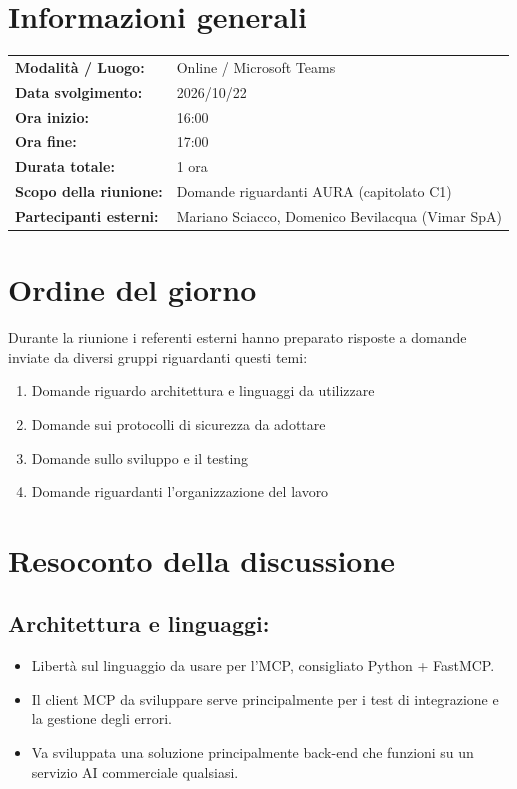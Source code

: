 \documentclass[a4paper, 11pt]{article}
\begin{document}
\newpage
\tableofcontents
\newpage


\section{Informazioni generali}
\begin{tabularx}{\textwidth}{l X}
    \textbf{Modalità / Luogo:} & Online / Microsoft Teams \\
    \textbf{Data svolgimento:} & 2026/10/22 \\
    \textbf{Ora inizio:} & 16:00 \\
    \textbf{Ora fine:} & 17:00 \\
    \textbf{Durata totale:} & 1 ora \\
    \textbf{Scopo della riunione:} & Domande riguardanti AURA (capitolato C1) \\
    \textbf{Partecipanti esterni:} & Mariano Sciacco, Domenico Bevilacqua (Vimar SpA)
\end{tabularx}

\newpage


\section{Ordine del giorno}
Durante la riunione i referenti esterni hanno preparato risposte a domande inviate da diversi gruppi riguardanti questi temi:
\begin{enumerate}
    \item Domande riguardo architettura e linguaggi da utilizzare
    \item Domande sui protocolli di sicurezza da adottare
    \item Domande sullo sviluppo e il testing
    \item Domande riguardanti l'organizzazione del lavoro
\end{enumerate}

\newpage


\section{Resoconto della discussione}

\subsection{Architettura e linguaggi:}
\begin{itemize}
    \item Libertà sul linguaggio da usare per l'MCP, consigliato Python + FastMCP. \vspace{-0.1cm}
    \item Il client MCP da sviluppare serve principalmente per i test di integrazione e la gestione degli errori. \vspace{-0.1cm}
    \item Va sviluppata una soluzione principalmente back-end che funzioni su un servizio AI commerciale qualsiasi. \vspace{-0.1cm}
\end{itemize}
\end{document}
